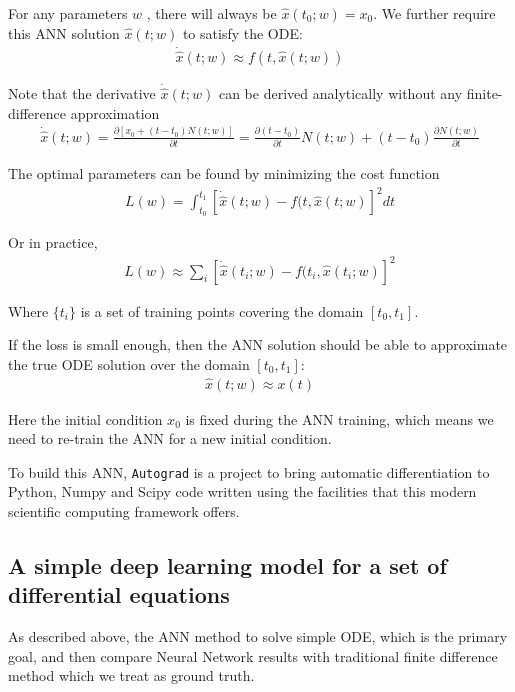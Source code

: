 \documentclass[a4paper]{article}
\numberwithin{equation}{section}
\begin{document}
For any parameters \(w\) , there will always be \(\hat{x}(t_0; w) = x_0\). We further require this ANN solution \(\hat{x}(t; w)\) to satisfy the ODE:
\begin{align*}
  \dot{\hat{x}}(t; w) \approx f(t, \hat{x}(t; w))
\end{align*}

Note that the derivative \(\dot{\hat{x}}(t; w)\) can be derived analytically without any finite-difference approximation
\begin{align*}
  \dot{\hat{x}}(t; w) = \frac{\partial [x_0 + (t - t_0)N(t; w)]}{\partial t} = \frac{\partial (t - t_0)}{\partial t}N(t; w) + (t - t_0)\frac{\partial N(t; w)}{\partial t}
\end{align*}

The optimal parameters can be found by minimizing the cost function
\begin{align*}
  L(w) = \int_{t_0}^{t_1} [\dot{\hat{x}}(t; w) - f(t, \hat{x}(t; w)]^2 dt
\end{align*}

Or in practice,
\begin{align*}
  L(w) \approx \sum_i [\dot{\hat{x}}(t_i; w) - f(t_i, \hat{x}(t_i; w)]^2
\end{align*}

Where \(\{t_i\}\) is a set of training points covering the domain \([t_0, t_1]\).

If the loss is small enough, then the ANN solution should be able to approximate the true ODE solution over the domain \([t_0, t_1]\):
\begin{align*}
  \hat{x}(t; w) \approx x(t)
\end{align*}

Here the initial condition \(x_0\) is fixed during the ANN training, which means we need to re-train the ANN for a new initial condition.

To build this ANN, \texttt{Autograd} is a project to bring automatic differentiation to Python, Numpy \cite{oliphant2007python} and Scipy \cite{jones2001scipy} code written using the facilities that this modern scientific computing framework offers.

\subsection{A simple deep learning model for a set of differential equations}
As described above, the ANN method to solve simple ODE, which is the primary goal, and then compare Neural Network results with traditional finite difference method which we treat as ground truth.
\end{document}
